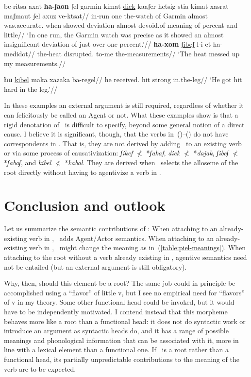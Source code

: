   \a \begingl
    \gla be-ritsa axat \textbf{ha-ʃaon} ʃel garmin kimat \underline{diek} kaaʃer hetsig stia kimat xasrat maʃmaut ʃel axuz ve-ktsat//
    \glb in-run one the-watch of Garmin almost was.accurate. when showed deviation almost devoid.of meaning of percent and-little//
    \glft `In one run, the Garmin watch was precise as it showed an almost insignificant deviation of just over one percent.'//
  \endgl
  \a \begingl
    \gla \textbf{ha-xom} \underline{ʃibeʃ} l-i et ha-medidot//
    \glb the-heat disrupted. to-me  the-measurements//
    \glft `The heat messed up my measurements.//
  \endgl
\xe

\ex \begingl
  \gla \textbf{hu} \underline{kibel} maka xazaka ba-regel//
  \glb he received. hit strong in.the-leg//
  \glft `He got hit hard in the leg.'//
  \endgl
\xe

In these examples an external argument is still required, regardless of whether it can felicitously be called an Agent or not. What these examples show is that a rigid denotation of \va~is difficult to specify, beyond some general notion of a direct cause. I believe it is significant, though, that the verbs in~(\blastx)--(\lastx) do not have correspondents in \tkal. That is, they are not derived by adding \va~to an existing verb or via some process of causativization: \emph{ʃikef} $\nless$ *\emph{ʃakaf}, \emph{diek} $\nless$ *\emph{dajak}, \emph{ʃibeʃ} $\nless$ *\emph{ʃabaʃ}, and \emph{kibel} $\nless$ *\emph{kabal}. They are derived when \va~selects the alloseme of the root directly without having to agentivize a verb in \tkal.



\section{Conclusion and outlook} \label{voice:conc}

Let us summarize the semantic contributions of \va:
\pex
  \a When attaching to an already-existing verb in \tkal, \va~adds Agent/Actor semantics.
  \a When attaching to an already-existing verb in \tkal, \va~might change the meaning as in~(\ref{table:piel-meanings}).
  \a When attaching to the root without a verb already existing in \tkal, agentive semantics need not be entailed (but an external argument is still obligatory).
\xe

Why, then, should this element be a root? The same job could in principle be accomplished using a  ``flavor'' of little v{, but I see no empirical need for ``flavors'' of v in my theory. }{Some other} functional head could be invoked, but it would have to be independently motivated. {I contend instead that} this morpheme behaves more like a root than a functional head: it does not {do syntactic work or }introduce an argument as syntactic heads do, and it has a range of possible meanings and phonological information that can be associated with it, more in line with a lexical element than a functional one. If \va~is a root rather than a functional head, its partially unpredictable contributions to the meaning of the verb are to be expected.


